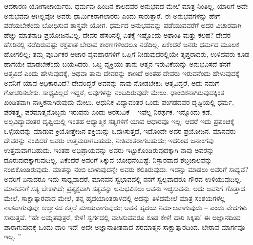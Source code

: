 ಆದಕಾರಣ ಯೋಗಾಚಾರ್ಯರು, ಧರ್ಮವು ಹಿಂದಿನ ಕಾಲದವರ ಅನುಭವದ ಮೇಲೆ ಮಾತ್ರ ನಿಂತಿಲ್ಲ, ಯಾರಿಗೆ ಅದೇ ಅನುಭವವು ಆಗಿಲ್ಲವೋ ಅವರು ಧಾರ್ಮಿಕರಾಗ\break ಲಾರರು ಎಂದು ಸಾರುತ್ತಾರೆ. ಈ ಅನುಭವಗಳನ್ನು ಹೇಗೆ ಪಡೆಯಬೇಕೆಂದು ಬೋಧಿಸುವ ಶಾಸ್ತ್ರವೇ ಯೋಗ. ಧರ್ಮದ ಅನುಭವವನ್ನು ಪಡೆಯುವವರೆಗೆ ಅದರ ವಿಚಾರವಾಗಿ ಹೆಚ್ಚು ಮಾತನಾಡಿ ಪ್ರಯೋಜನವಿಲ್ಲ. ದೇವರ ಹೆಸರಿನಲ್ಲಿ ಏತಕ್ಕೆ ಇಷ್ಟೊಂದು ಅಶಾಂತಿ ಮತ್ತು ಕಲಹ? ದೇವರ ಹೆಸರಿನಲ್ಲಿ ನಡೆದಿರುವಷ್ಟು ರಕ್ತಪಾತ ಬೇರಾವ ಕಾರಣಗಳಿಂದಲೂ ನಡೆದಿಲ್ಲ. ಏಕೆಂದರೆ ಜನರು ಧರ್ಮದ ಮೂಲಕ ಹೋಗಲಿಲ್ಲ; ತಮ್ಮ ಪೂರ್ವಿಕರ ಆಚಾರ ವ್ಯವಹಾರಗಳಿಗೆ ಒಪ್ಪಿಗೆ ನೀಡುವುದರಲ್ಲಿಯೇ ತೃಪ್ತರಾದರು, ಉಳಿದವರು ಕೂಡ ಹಾಗೆಯೇ ಮಾಡಬೇಕೆಂದು ಬಯಸಿದರು. ಒಬ್ಬ ವ್ಯಕ್ತಿಯು ತಾನು ಆತ್ಮನ ಇರುವಿಕೆಯನ್ನು ಅನುಭವಿಸದೆ ತನಗೆ ಆತ್ಮವಿದೆ ಎಂದು ಹೇಳುವುದಕ್ಕೆ, ಅಥವಾ ತಾನು ದೇವರನ್ನು ಕಾಣದೆ ಅಂತಹ ದೇವರು ಇರುವನೆಂದು ಹೇಳುವುದಕ್ಕೆ ಅವನಿಗೆ ಯಾವ ಅಧಿಕಾರವಿದೆ? ದೇವರಿದ್ದರೆ ಅವನನ್ನು ನಾವು ನೋಡಬೇಕು; ಆತ್ಮವಿದ್ದರೆ, ಅದು ನಮಗೆ ಗೋಚರಿಸಬೇಕು. ಸಾಧ್ಯವಿಲ್ಲದೆ ಇದ್ದರೆ, ಅವುಗಳನ್ನು ನಂಬದಿರುವುದೇ ಮೇಲು. ಢಾಂಬಿಕನಾಗಿರುವುದಕ್ಕಿಂತ ಖಂಡಿತವಾಗಿ ನಾಸ್ತಿಕನಾಗಿರುವುದು ಮೇಲು. ಆಧುನಿಕ ವಿದ್ಯಾವಂತರ ಒಂದು ಪಂಗಡದವರ ದೃಷ್ಟಿಯಲ್ಲಿ ಧರ್ಮ, ಪರತತ್ತ್ವ, ಪರಮಾತ್ಮನೊಬ್ಬನು ಇರುವನು ಎಂದು ಅರಸುವಿಕೆ – ಇವೆಲ್ಲ ನಿರರ್ಥಕ. ಇನ್ನೊಂದು ಕಡೆ, ಅಲ್ಪವಿದ್ಯಾವಂತರ ದೃಷ್ಟಿಯಲ್ಲಿ ಇಂತಹ ಆಧ್ಯಾತ್ಮಿಕ ಸತ್ಯಗಳಿಗೆ ಯಾವ ಆಧಾರವೂ ಇಲ್ಲ; ಆದರೆ ಇದು ಪ್ರಪಂಚಕ್ಕೆ ಒಳ್ಳೆಯದನ್ನು ಮಾಡುವ ಕ್ರಿಯೋತ್ತೇಜನ ಶಕ್ತಿಯನ್ನು ಒದಗಿಸುತ್ತದೆ, ಇದೊಂದೇ ಅದರ ಪ್ರಯೋಜನ. ಮಾನವರು ದೇವರನ್ನು ನಂಬಿದರೆ ಅವರು ಉತ್ತಮರಾಗಬಹುದು, ನೀತಿವಂತರಾಗಬಹುದು; ಇದರಿಂದ ಜನಾಂಗವು ಉತ್ತಮವಾಗಬಹುದು. ಇಂತಹ ಅಭಿಪ್ರಾಯವನ್ನು ಅವರು ಇಟ್ಟುಕೊಂಡಿರುವುದಕ್ಕಾಗಿ ನಾವು ಅವರನ್ನು ದೂರುವುದಕ್ಕಾಗುವುದಿಲ್ಲ. ಏಕೆಂದರೆ ಅವರಿಗೆ ಸಿಕ್ಕುವ ಬೋಧನೆಯಿಷ್ಟೆ: ನಿಸ್ಸಾರವಾದ ಶಬ್ದಜಾಲವನ್ನು ನಂಬಿಕೊಂಡಿರುವುದು. ಮಾತನ್ನು ನಂಬಿ ಬಾಳುವುದನ್ನೇ ಅವರು ಕಲಿತಿರುವುದು. ಇದನ್ನು ಮಾಡಲು ಅವರಿಗೆ ಸಾಧ್ಯವೆ? ಅವರಿಗೆ ಏನಾದರೂ ಇದು ಸಾಧ್ಯವಾದರೆ, ಮಾನವನ ಸ್ವಭಾವದಲ್ಲಿ ನನಗೆ ಸ್ವಲ್ಪವಾದರೂ ಗೌರವ ಉಳಿಯುವುದಿಲ್ಲ. ಮಾನವನಿಗೆ ಸತ್ಯ ಬೇಕಾಗಿದೆ; ಪ್ರತ್ಯಕ್ಷವಾಗಿ ಸತ್ಯವನ್ನು ಅನುಭವಿಸಲು ಅವನು ಇಚ್ಛಿಸುವನು. ಅದು ಅವನಿಗೆ ಗೊತ್ತಾದ ಮೇಲೆ, ಸಾಕ್ಷಾತ್ಕಾರವಾದ ಮೇಲೆ, ತನ್ನ ಹೃದಯಾಂತರಾಳದಲ್ಲಿ ಅದನ್ನು ತಿಳಿದಮೇಲೆ ಮಾತ್ರ ಸಂಶಯಗಳೆಲ್ಲ ನಾಶವಾಗುವುವು; ಅಜ್ಞಾನದ ಕತ್ತಲೆ ಮಾಯವಾಗುವುದು; ಅವನ ಹೃದಯ ನಿರ್ಮಲವಾಗುವುದು – ಎಂದು ವೇದಗಳು ಸಾರುತ್ತವೆ. “ಹೇ ಅಮೃತಪುತ್ರರೆ, ಕೇಳಿ! ಸ್ವರ್ಗದಲ್ಲಿ ವಾಸಿಸುವವರೂ ಕೂಡ ಕೇಳಿ! ದಾರಿ ಸಿಕ್ಕಿತು! ಈ ಅಜ್ಞಾನದಿಂದ ಪಾರಾಗುವುದಕ್ಕೆ ಒಂದು ದಾರಿ ಇದೆ! ಅದೇ ಅಜ್ಞಾನಾತೀತನಾದ ಪರಮಾತ್ಮನ ಸಾಕ್ಷಾತ್ಕಾರದಿಂದ. ಬೇರಾವ ಮಾರ್ಗವೂ ಇಲ್ಲ. ”

\vskip 0.5cm

